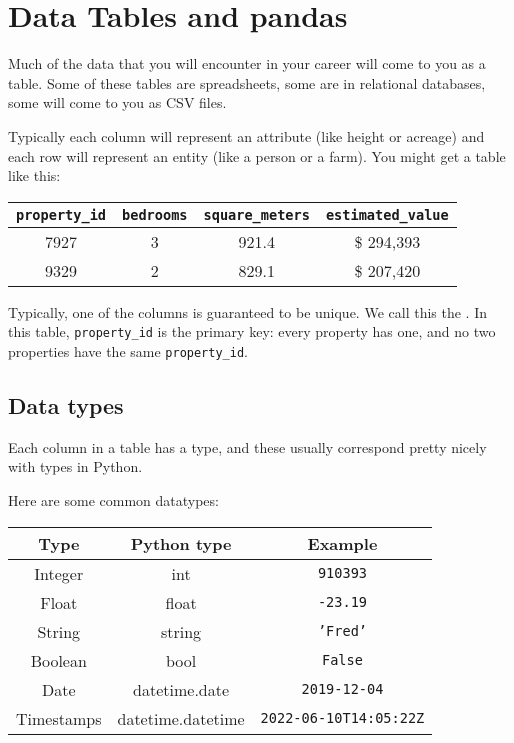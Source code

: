 \chapter{Data Tables and pandas}

Much of the data that you will encounter in your career will come to
you as a table.  Some of these tables are spreadsheets, some are in
relational databases, some will come to you as CSV files.

Typically each column will represent an attribute (like height or
acreage) and each row will represent an entity (like a person or a
farm). You might get a table like this:

\begin{tabular}{c | c | c | c}
  \texttt{property\_id} & \texttt{bedrooms} & \texttt{square\_meters} & \texttt{estimated\_value} \\
  \hline
  7927 &  3 & 921.4 & \$ 294,393 \\
  9329 &  2 & 829.1 & \$ 207,420 \\
\end{tabular}

Typically, one of the columns is guaranteed to be unique. We call this
the .  In this table, \texttt{property\_id} is
the primary key: every property has one, and no two properties have
the same \texttt{property\_id}.

\section{Data types}

Each column in a table has a type, and these usually correspond pretty nicely with types in Python.

Here are some common datatypes:

\begin{tabular}{c | c | c }
  Type & Python type & Example \\
  \hline
  Integer & int & \texttt{910393} \\
  Float & float & \texttt{-23.19} \\
  String & string & \texttt{'Fred'} \\
  Boolean & bool & \texttt{False} \\
  Date & datetime.date & \texttt{2019-12-04} \\
  Timestamps & datetime.datetime & \texttt{2022-06-10T14:05:22Z} \\
\end{tabular}

